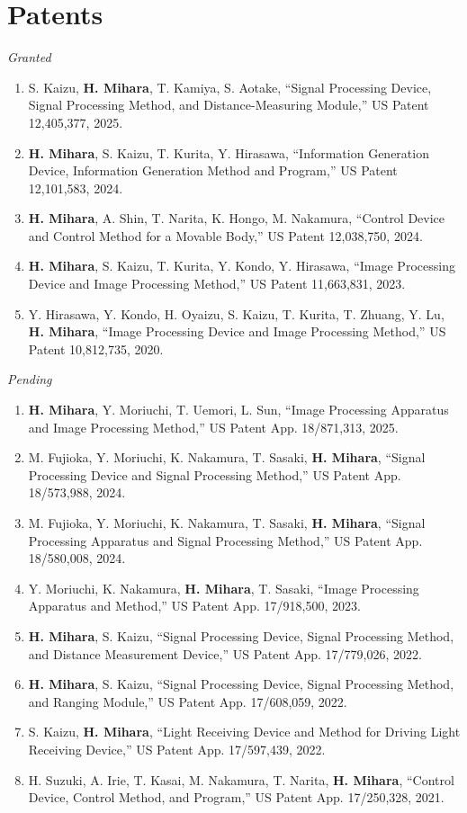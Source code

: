 \documentclass[a4paper,11pt]{article}
\begin{document}
\section{Patents}
 {\small\textit{Granted}}
 \begin{enumerate}[leftmargin=0.6cm]
   \small
   \item S. Kaizu, \textbf{H. Mihara}, T. Kamiya, S. Aotake, ``Signal Processing Device, Signal Processing Method, and Distance-Measuring Module,'' US Patent 12,405,377, 2025.
   \item \textbf{H. Mihara}, S. Kaizu, T. Kurita, Y. Hirasawa, ``Information Generation Device, Information Generation Method and Program,'' US Patent 12,101,583, 2024.
   \item \textbf{H. Mihara}, A. Shin, T. Narita, K. Hongo, M. Nakamura, ``Control Device and Control Method for a Movable Body,'' US Patent 12,038,750, 2024.
   \item \textbf{H. Mihara}, S. Kaizu, T. Kurita, Y. Kondo, Y. Hirasawa, ``Image Processing Device and Image Processing Method,'' US Patent 11,663,831, 2023.
   \item Y. Hirasawa, Y. Kondo, H. Oyaizu, S. Kaizu, T. Kurita, T. Zhuang, Y. Lu, \textbf{H. Mihara}, ``Image Processing Device and Image Processing Method,'' US Patent 10,812,735, 2020.
 \end{enumerate}
 \vspace{2pt}
 {\small\textit{Pending}}
 \begin{enumerate}[leftmargin=0.6cm]
   \small
   \item \textbf{H. Mihara}, Y. Moriuchi, T. Uemori, L. Sun, ``Image Processing Apparatus and Image Processing Method,'' US Patent App. 18/871,313, 2025.
   \item M. Fujioka, Y. Moriuchi, K. Nakamura, T. Sasaki, \textbf{H. Mihara}, ``Signal Processing Device and Signal Processing Method,'' US Patent App. 18/573,988, 2024.
   \item M. Fujioka, Y. Moriuchi, K. Nakamura, T. Sasaki, \textbf{H. Mihara}, ``Signal Processing Apparatus and Signal Processing Method,'' US Patent App. 18/580,008, 2024.
   \item Y. Moriuchi, K. Nakamura, \textbf{H. Mihara}, T. Sasaki, ``Image Processing Apparatus and Method,'' US Patent App. 17/918,500, 2023.
   \item \textbf{H. Mihara}, S. Kaizu, ``Signal Processing Device, Signal Processing Method, and Distance Measurement Device,'' US Patent App. 17/779,026, 2022.
   \item \textbf{H. Mihara}, S. Kaizu, ``Signal Processing Device, Signal Processing Method, and Ranging Module,'' US Patent App. 17/608,059, 2022.
   \item S. Kaizu, \textbf{H. Mihara}, ``Light Receiving Device and Method for Driving Light Receiving Device,'' US Patent App. 17/597,439, 2022.
   \item H. Suzuki, A. Irie, T. Kasai, M. Nakamura, T. Narita, \textbf{H. Mihara}, ``Control Device, Control Method, and Program,'' US Patent App. 17/250,328, 2021.
 \end{enumerate}
\end{document}
